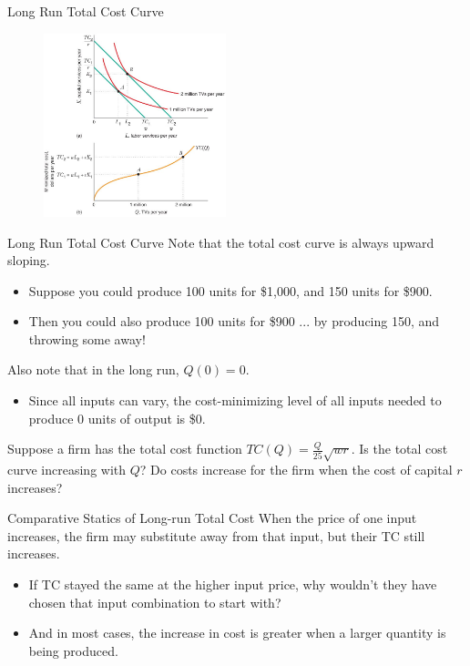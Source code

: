 \documentclass[11pt,t]{beamer}
\begin{document}
\begin{frame}{Long Run Total Cost Curve}
  \begin{figure}
    \includegraphics[width=200px]{figures/fig8_1.jpg}
  \end{figure}
\end{frame}

\begin{frame}{Long Run Total Cost Curve}
  Note that the total cost curve is always upward sloping.

  \begin{itemize}
    \item Suppose you could produce 100 units for \$1,000, and 150 units for \$900.
    \item Then you could also produce 100 units  for \$900 ... by producing 150, and throwing some away!
  \end{itemize}

  \bigskip \pause
  Also note that in the long run, $Q(0)=0$.

 \begin{itemize}
  \item Since all inputs can vary, the cost-minimizing level of all inputs needed to produce 0 units of output is \$0.
 \end{itemize}
\end{frame}

\begin{frame}

\bigskip
Suppose a firm has the total cost function $TC(Q)=\frac{Q}{25}\sqrt{wr}$. Is the total cost curve increasing with $Q$? Do costs increase for the firm when the cost of capital $r$ increases?
\end{frame}

\begin{frame}{Comparative Statics of Long-run Total Cost}
  When the price of one input increases, the firm may substitute away from that input, but their TC still increases.

  \begin{itemize}
    \item If TC stayed the same at the higher input price, why wouldn't they have chosen that input combination to start with?

    \item And in most cases, the increase in cost is greater when a larger quantity is being produced.
  \end{itemize}

\end{frame}
\end{document}
